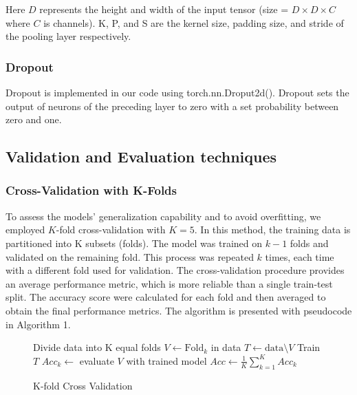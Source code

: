 Here $D$ represents the height and width of the input tensor (size = $D\times D \times C$ where $C$ is channels). K, P, and S are the kernel size, padding size, and stride of the pooling layer respectively.

\subsubsection{Dropout}
Dropout is implemented in our code using torch.nn.Droput2d(). Dropout sets the output of neurons of the preceding layer to zero with a set probability between zero and one. 


\subsection{Validation and Evaluation techniques}

\subsubsection{Cross-Validation with K-Folds}

To assess the models' generalization capability and to avoid overfitting, we employed $K$-fold cross-validation with $K = 5$. In this method, the training data is partitioned into K subsets (folds). The model was trained on $k-1$ folds and validated on the remaining fold. This process was repeated $k$ times, each time with a different fold used for validation. The cross-validation procedure provides an average performance metric, which is more reliable than a single train-test split. The accuracy score were calculated for each fold and then averaged to obtain the final performance metrics. The algorithm is presented with pseudocode in Algorithm 1. 


\begin{figure}[H]
    \begin{algorithm}[H]
    \caption{K-fold Cross Validation \cite{K-foldCrossValidation}}
    \label{algo:kfold}
        \begin{algorithmic}[1]
            \State Divide data into K equal folds 
                \State $V \gets \text{Fold}_{k}$ in data
                \State $T \gets \text{data} \setminus V$
                \State Train $T$
                \State $Acc_k \gets$ evaluate $V$ with trained model
            \EndFor
            \State $Acc \gets \frac{1}{K} \sum_{k=1}^{K} Acc_k$
             \EndProcedure
        \end{algorithmic}
    \end{algorithm}
\end{figure}

